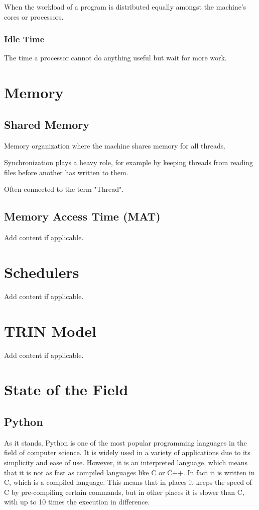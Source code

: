 \documentclass{article}
\begin{document}
When the workload of a program is distributed equally amongst the machine's cores or processors.

\subsubsection{Idle Time}

The time a processor cannot do anything useful but wait for more work.

\section{Memory}
\subsection{Shared Memory}

Memory organization where the machine shares memory for all threads.

Synchronization plays a heavy role, for example by keeping threads from reading files before another has written to them.

Often connected to the term "Thread".

\subsection{Memory Access Time (MAT)}

Add content if applicable.

\section{Schedulers}

Add content if applicable.

\section{TRIN Model}

Add content if applicable.

\section{State of the Field}
\subsection{Python}

As it stands, Python is one of the most popular programming languages in the field of computer science. It is widely used in a variety of applications due to its simplicity and ease of use. However, it is an interpreted language, which means that it is not as fast as compiled languages like C or C++. In fact it is written in C, which is a compiled language. This means that in places it keeps the speed of C by pre-compiling certain commands, but in other places it is slower than C, with up to 10 times the execution in difference.
\end{document}
